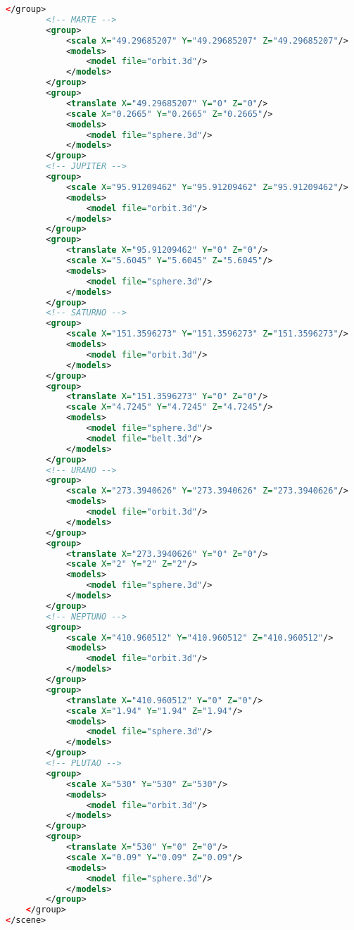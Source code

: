 \documentclass[a4paper]{article}
\begin{document}
\begin{lstlisting}[language=XML]
        </group>
        <!-- MARTE -->
        <group>
            <scale X="49.29685207" Y="49.29685207" Z="49.29685207"/>
            <models>
                <model file="orbit.3d"/>
            </models>
        </group>
        <group>
            <translate X="49.29685207" Y="0" Z="0"/>
            <scale X="0.2665" Y="0.2665" Z="0.2665"/>
            <models>
                <model file="sphere.3d"/>
            </models>
        </group>
        <!-- JUPITER -->
        <group>
            <scale X="95.91209462" Y="95.91209462" Z="95.91209462"/>
            <models>
                <model file="orbit.3d"/>
            </models>
        </group>
        <group>
            <translate X="95.91209462" Y="0" Z="0"/>
            <scale X="5.6045" Y="5.6045" Z="5.6045"/>
            <models>
                <model file="sphere.3d"/>
            </models>
        </group>
        <!-- SATURNO -->
        <group>
            <scale X="151.3596273" Y="151.3596273" Z="151.3596273"/>
            <models>
                <model file="orbit.3d"/>
            </models>
        </group>
        <group>
            <translate X="151.3596273" Y="0" Z="0"/>
            <scale X="4.7245" Y="4.7245" Z="4.7245"/>
            <models>
                <model file="sphere.3d"/>
                <model file="belt.3d"/>
            </models>
        </group>
        <!-- URANO -->
        <group>
            <scale X="273.3940626" Y="273.3940626" Z="273.3940626"/>
            <models>
                <model file="orbit.3d"/>
            </models>
        </group>
        <group>
            <translate X="273.3940626" Y="0" Z="0"/>
            <scale X="2" Y="2" Z="2"/>
            <models>
                <model file="sphere.3d"/>
            </models>
        </group>
        <!-- NEPTUNO -->
        <group>
            <scale X="410.960512" Y="410.960512" Z="410.960512"/>
            <models>
                <model file="orbit.3d"/>
            </models>
        </group>
        <group>
            <translate X="410.960512" Y="0" Z="0"/>
            <scale X="1.94" Y="1.94" Z="1.94"/>
            <models>
                <model file="sphere.3d"/>
            </models>
        </group>
        <!-- PLUTAO -->
        <group>
            <scale X="530" Y="530" Z="530"/>
            <models>
                <model file="orbit.3d"/>
            </models>
        </group>
        <group>
            <translate X="530" Y="0" Z="0"/>
            <scale X="0.09" Y="0.09" Z="0.09"/>
            <models>
                <model file="sphere.3d"/>
            </models>
        </group>
    </group>
</scene>

\end{lstlisting}

\newpage


\end{document}
